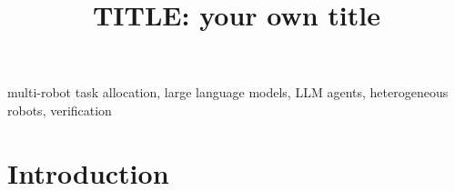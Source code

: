 \documentclass[conference]{IEEEtran}
\begin{document}
\title{TITLE: your own title}

\author{
}

\maketitle

\begin{abstract}
\end{abstract}

\begin{IEEEkeywords}
multi-robot task allocation, large language models, LLM agents, heterogeneous robots, verification
\end{IEEEkeywords}

\section{Introduction}
\end{document}
